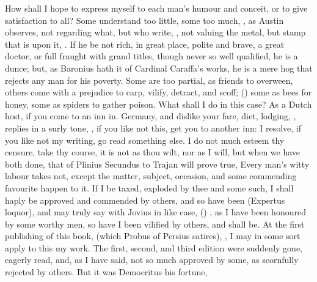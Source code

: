 {How shall I hope to express myself to each man's humour and
conceit, or to give satisfaction to all? Some understand too
little, some too much, , as Austin observes, not regarding what, but who
write, , not valuing the metal,
but stamp that is upon it, . If he
be not rich, in great place, polite and brave, a great doctor, or full
fraught with grand titles, though never so well qualified, he is a
dunce; but, as Baronius hath it of Cardinal Caraffa's works, he is
a mere hog that rejects any man for his poverty. Some are too partial,
as friends to overween, others come with a prejudice to carp, vilify,
detract, and scoff; () some as bees for honey, some as spiders to gather
poison. What shall I do in this case? As a Dutch host, if you come to
an inn in. Germany, and dislike your fare, diet, lodging, \etc, replies
in a surly tone, , if you like not
this, get you to another inn: I resolve, if you like not my writing, go
read something else. I do not much esteem thy censure, take thy course,
it is not as thou wilt, nor as I will, but when we have both done, that
of Plinius Secundus to Trajan will prove true, Every man's witty
labour takes not, except the matter, subject, occasion, and some
commending favourite happen to it. If I be taxed, exploded by thee and
some such, I shall haply be approved and commended by others, and so
have been (Expertus loquor), and may truly say with Jovius in like
case, () , as I have been
honoured by some worthy men, so have I been vilified by others, and
shall be. At the first publishing of this book, (which Probus of
Persius satires), , I may in some sort apply to this my work. The
first, second, and third edition were suddenly gone, eagerly read, and,
as I have said, not so much approved by some, as scornfully rejected by
others. But it was Democritus his fortune, }
